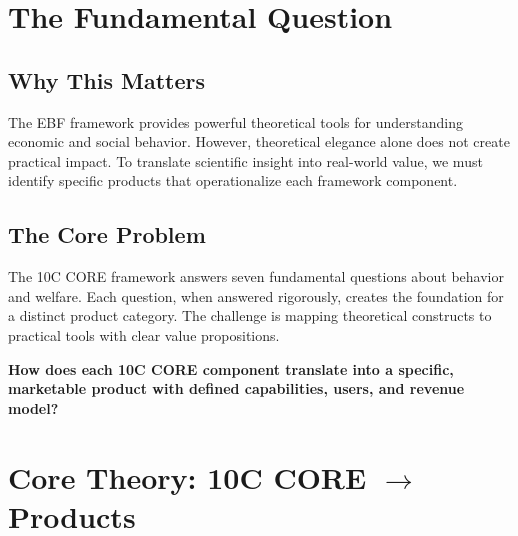 
\section{The Fundamental Question}
\label{sec:vvv3-fundamental}

\subsection{Why This Matters}

The EBF framework provides powerful theoretical tools for understanding economic and social behavior. However, theoretical elegance alone does not create practical impact. To translate scientific insight into real-world value, we must identify specific products that operationalize each framework component.

\subsection{The Core Problem}

The 10C CORE framework answers seven fundamental questions about behavior and welfare. Each question, when answered rigorously, creates the foundation for a distinct product category. The challenge is mapping theoretical constructs to practical tools with clear value propositions.

\begin{tcolorbox}[colback=red!5!white, colframe=red!75!black,
    title=The Fundamental Question]
\textbf{How does each 10C CORE component translate into a specific, marketable product with defined capabilities, users, and revenue model?}
\end{tcolorbox}


\section{Core Theory: 10C CORE $\to$ Products}
\label{sec:vvv3-theory}

